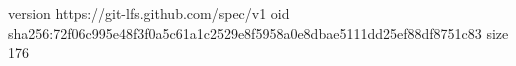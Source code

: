 version https://git-lfs.github.com/spec/v1
oid sha256:72f06c995e48f3f0a5c61a1c2529e8f5958a0e8dbae5111dd25ef88df8751c83
size 176
